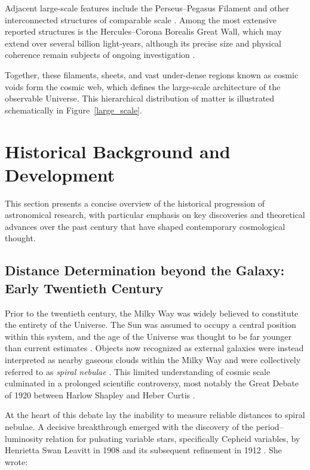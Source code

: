 Adjacent large-scale features include the Perseus--Pegasus Filament and other interconnected structures of comparable scale \citep{Haynes1988}. Among the most extensive reported structures is the Hercules--Corona Borealis Great Wall, which may extend over several billion light-years, although its precise size and physical coherence remain subjects of ongoing investigation \citep{Horvath2014}.




Together, these filaments, sheets, and vast under-dense regions known as cosmic voids form the cosmic web, which defines the large-scale architecture of the observable Universe. This hierarchical distribution of matter is illustrated schematically in Figure~\ref{large_scale}.


\section{Historical Background and Development}

This section presents a concise overview of the historical progression of astronomical research, with particular emphasis on key discoveries and theoretical advances over the past century that have shaped contemporary cosmological thought.

\subsection{Distance Determination beyond the Galaxy: Early Twentieth Century}

Prior to the twentieth century, the Milky Way was widely believed to constitute the entirety of the Universe. The Sun was assumed to occupy a central position within this system, and the age of the Universe was thought to be far younger than current estimates \citep{Kragh1996}. Objects now recognized as external galaxies were instead interpreted as nearby gaseous clouds within the Milky Way and were collectively referred to as \textit{spiral nebulae} \citep{Sandage1981}. This limited understanding of cosmic scale culminated in a prolonged scientific controversy, most notably the Great Debate of 1920 between Harlow Shapley and Heber Curtis \citep{Shapley1921, Curtis1921}.

At the heart of this debate lay the inability to measure reliable distances to spiral nebulae. A decisive breakthrough emerged with the discovery of the period--luminosity relation for pulsating variable stars, specifically Cepheid variables, by Henrietta Swan Leavitt in 1908 and its subsequent refinement in 1912 \citep{1908leavitt,1912leavitt}. She wrote:


